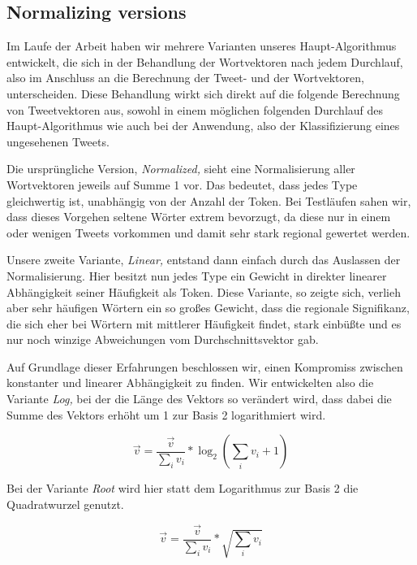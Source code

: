 \documentclass[../Main.tex]{subfiles}
\begin{document}
\subsection{Normalizing versions}
Im Laufe der Arbeit haben wir mehrere Varianten unseres Haupt-Algorithmus entwickelt, die sich in der Behandlung der Wortvektoren nach jedem Durchlauf, also im Anschluss an die Berechnung der Tweet- und der Wortvektoren, unterscheiden. Diese Behandlung wirkt sich direkt auf die folgende Berechnung von Tweetvektoren aus, sowohl in einem möglichen folgenden Durchlauf des Haupt-Algorithmus wie auch bei der Anwendung, also der Klassifizierung eines ungesehenen Tweets.

Die ursprüngliche Version, \textit{Normalized,} sieht eine Normalisierung aller Wortvektoren jeweils auf Summe 1 vor. Das bedeutet, dass jedes Type gleichwertig ist, unabhängig von der Anzahl der Token. Bei Testläufen sahen wir, dass dieses Vorgehen seltene Wörter extrem bevorzugt, da diese nur in einem oder wenigen Tweets vorkommen und damit sehr stark regional gewertet werden.

Unsere zweite Variante, \textit{Linear,} entstand dann einfach durch das Auslassen der Normalisierung. Hier besitzt nun jedes Type ein Gewicht in direkter linearer Abhängigkeit seiner Häufigkeit als Token. Diese Variante, so zeigte sich, verlieh aber sehr häufigen Wörtern ein so großes Gewicht, dass die regionale Signifikanz, die sich eher bei Wörtern mit mittlerer Häufigkeit findet, stark einbüßte und es nur noch winzige Abweichungen vom Durchschnittsvektor gab.

Auf Grundlage dieser Erfahrungen beschlossen wir, einen Kompromiss zwischen konstanter und linearer Abhängigkeit zu finden. Wir entwickelten also die Variante \textit{Log,} bei der die Länge des Vektors so verändert wird, dass dabei die Summe des Vektors erhöht um 1 zur Basis 2 logarithmiert wird.

$$\vec v = \frac{\vec v}{\sum_i v_i} * \log_2(\sum_i v_i+1)$$

Bei der Variante \textit{Root} wird hier statt dem Logarithmus zur Basis 2 die Quadratwurzel genutzt.

$$\vec v = \frac{\vec v}{\sum_i v_i} * \sqrt{\sum_i v_i}$$
\end{document}
